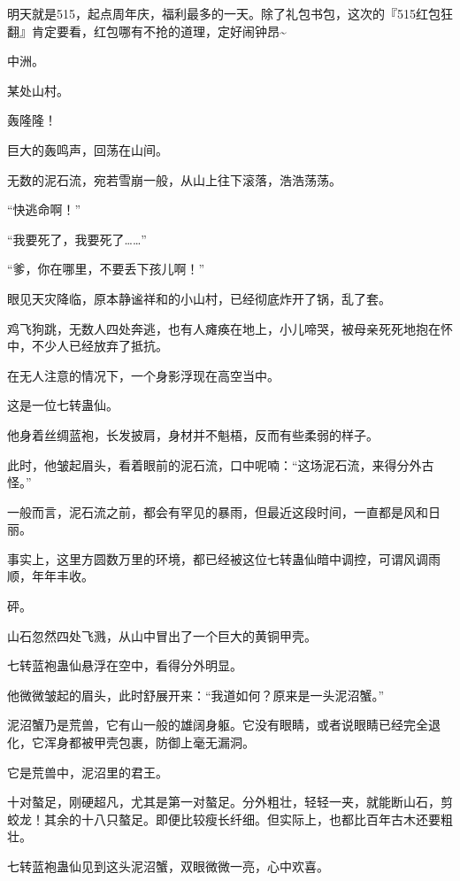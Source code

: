 
\begin{this_body}



明天就是515，起点周年庆，福利最多的一天。除了礼包书包，这次的『515红包狂翻』肯定要看，红包哪有不抢的道理，定好闹钟昂\~{}

中洲。

某处山村。

轰隆隆！

巨大的轰鸣声，回荡在山间。

无数的泥石流，宛若雪崩一般，从山上往下滚落，浩浩荡荡。

“快逃命啊！”

“我要死了，我要死了……”

“爹，你在哪里，不要丢下孩儿啊！”

眼见天灾降临，原本静谧祥和的小山村，已经彻底炸开了锅，乱了套。

鸡飞狗跳，无数人四处奔逃，也有人瘫痪在地上，小儿啼哭，被母亲死死地抱在怀中，不少人已经放弃了抵抗。

在无人注意的情况下，一个身影浮现在高空当中。

这是一位七转蛊仙。

他身着丝绸蓝袍，长发披肩，身材并不魁梧，反而有些柔弱的样子。

此时，他皱起眉头，看着眼前的泥石流，口中呢喃：“这场泥石流，来得分外古怪。”

一般而言，泥石流之前，都会有罕见的暴雨，但最近这段时间，一直都是风和日丽。

事实上，这里方圆数万里的环境，都已经被这位七转蛊仙暗中调控，可谓风调雨顺，年年丰收。

砰。

山石忽然四处飞溅，从山中冒出了一个巨大的黄铜甲壳。

七转蓝袍蛊仙悬浮在空中，看得分外明显。

他微微皱起的眉头，此时舒展开来：“我道如何？原来是一头泥沼蟹。”

泥沼蟹乃是荒兽，它有山一般的雄阔身躯。它没有眼睛，或者说眼睛已经完全退化，它浑身都被甲壳包裹，防御上毫无漏洞。

它是荒兽中，泥沼里的君王。

十对螯足，刚硬超凡，尤其是第一对螯足。分外粗壮，轻轻一夹，就能断山石，剪蛟龙！其余的十八只螯足。即便比较瘦长纤细。但实际上，也都比百年古木还要粗壮。

七转蓝袍蛊仙见到这头泥沼蟹，双眼微微一亮，心中欢喜。


\end{this_body}
